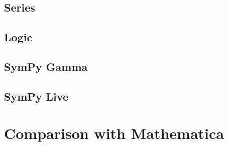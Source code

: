 \subsection{Series}



\subsection{Logic}


\subsection{SymPy Gamma}\label{sympy-gamma}



\subsection{SymPy Live}\label{sympy-live}



\section{Comparison with Mathematica}



